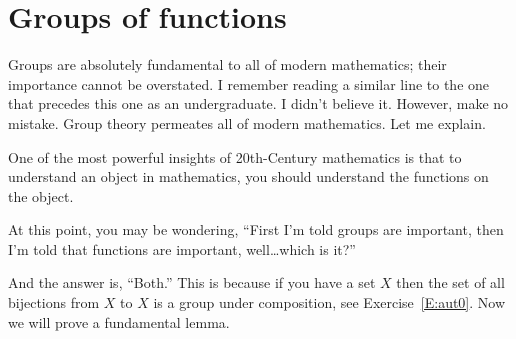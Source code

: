 \documentclass{ximera}
\begin{document}
\section{Groups of functions}

Groups are absolutely fundamental to all of modern mathematics; their
importance cannot be overstated. I remember reading a similar line to
the one that precedes this one as an undergraduate. I didn't believe
it. However, make no mistake. Group theory permeates all of modern
mathematics. Let me explain.

One of the most powerful insights of 20th-Century mathematics is that
to understand an object in mathematics, you should understand the
functions on the object.

At this point, you may be wondering, ``First I'm told groups are
important, then I'm told that functions are important, well\dots which
is it?''

And the answer is, ``Both.'' This is because if you have a set $X$
then the set of all bijections from $X$ to $X$ is a group under
composition, see Exercise~\ref{E:aut0}. Now we will prove a
fundamental lemma.
\end{document}
